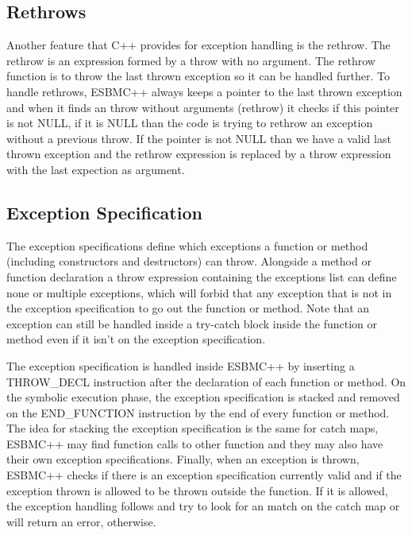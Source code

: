 \documentclass[a4paper]{llncs}
\begin{document}
\subsection{Rethrows}

Another feature that C++ provides for exception handling is the rethrow. The rethrow is an expression formed by
a throw with no argument. The rethrow function is to throw the last thrown exception so it can be handled further. To handle rethrows,
ESBMC++ always keeps a pointer to the last thrown exception and when it finds an throw without arguments (rethrow) it checks if this pointer
is not NULL, if it is NULL than the code is trying to rethrow an exception without a previous throw. If the pointer is not NULL than we have
a valid last thrown exception and the rethrow expression is replaced by a throw expression with the last expection as argument.

\subsection{Exception Specification}

The exception specifications define which exceptions a function or method (including constructors
and destructors) can throw. Alongside a method or function declaration a throw expression containing the exceptions list can define none or
multiple exceptions, which will forbid that any exception that is not in the exception specification to go out the function or method. Note
that an exception can still be handled inside a try-catch block inside the function or method even if it isn't on the exception specification.

The exception specification is handled inside ESBMC++ by inserting a THROW\_DECL instruction after the declaration of each function or method.
On the symbolic execution phase, the exception specification is stacked and removed on the END\_FUNCTION instruction by the end of every
function or method. The idea for stacking the exception specification is the same for catch maps, ESBMC++ may find function calls to other
function and they may also have their own exception specifications. Finally, when an exception is thrown, ESBMC++ checks if there is an
exception specification currently valid and if the exception thrown is allowed to be thrown outside the function. If it is allowed, the
exception handling follows and try to look for an match on the catch map or will return an error, otherwise.
\end{document}
